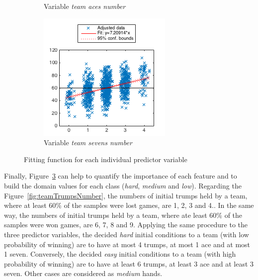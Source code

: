 \begin{figure}[h]
\begin{subfigure}[h]{0.32\textwidth}
                \caption{Variable \emph{team aces number}}
                \label{fig:teamAcesNumber}
        \end{subfigure}
        \begin{subfigure}[h]{0.32\textwidth}
                \includegraphics[width=\textwidth]{./img/4/teamSevensNumber}
                \caption{Variable \emph{team sevens number}}
                \label{fig:teamSevensNumber}
        \end{subfigure}
        \caption{Fitting function for each individual predictor variable}
        \label{fig:fitFunctions}
\end{figure}

Finally, Figure~\ref{fig:fitFunctions} can help to quantify the importance of each feature and to build the domain values for each class (\emph{hard}, \emph{medium} and \emph{low}).
Regarding the Figure~\ref{fig:teamTrumpsNumber}, the numbers of initial trumps held by a team, where at least 60\% of the samples were lost games, are 1, 2, 3 and 4..
In the same way, the numbers of initial trumps held by a team, where ate least 60\% of the samples were won games, are 6, 7, 8 and 9.
Applying the same procedure to the three predictor variables, the decided \emph{hard} initial conditions to a team (with low probability of winning) are to have at most 4 trumps, at most 1 ace and at most 1 seven.
Conversely, the decided \emph{easy} initial conditions to a team (with high probability of winning) are to have at least 6 trumps, at least 3 ace and at least 3 seven.
Other cases are considered as \emph{medium} hands.

